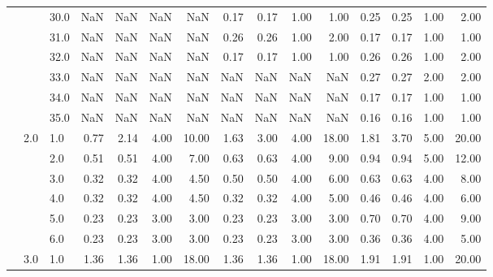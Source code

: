 \begin{tabular}{lllrrrrrrrrrrrr}
           &     & 30.0 &        NaN &       NaN &  NaN &    NaN &       0.17 &      0.17 & 1.00 &   1.00 &       0.25 &      0.25 & 1.00 &   2.00 \\
           &     & 31.0 &        NaN &       NaN &  NaN &    NaN &       0.26 &      0.26 & 1.00 &   2.00 &       0.17 &      0.17 & 1.00 &   1.00 \\
           &     & 32.0 &        NaN &       NaN &  NaN &    NaN &       0.17 &      0.17 & 1.00 &   1.00 &       0.26 &      0.26 & 1.00 &   2.00 \\
           &     & 33.0 &        NaN &       NaN &  NaN &    NaN &        NaN &       NaN &  NaN &    NaN &       0.27 &      0.27 & 2.00 &   2.00 \\
           &     & 34.0 &        NaN &       NaN &  NaN &    NaN &        NaN &       NaN &  NaN &    NaN &       0.17 &      0.17 & 1.00 &   1.00 \\
           &     & 35.0 &        NaN &       NaN &  NaN &    NaN &        NaN &       NaN &  NaN &    NaN &       0.16 &      0.16 & 1.00 &   1.00 \\
           & 2.0 & 1.0  &       0.77 &      2.14 & 4.00 &  10.00 &       1.63 &      3.00 & 4.00 &  18.00 &       1.81 &      3.70 & 5.00 &  20.00 \\
           &     & 2.0  &       0.51 &      0.51 & 4.00 &   7.00 &       0.63 &      0.63 & 4.00 &   9.00 &       0.94 &      0.94 & 5.00 &  12.00 \\
           &     & 3.0  &       0.32 &      0.32 & 4.00 &   4.50 &       0.50 &      0.50 & 4.00 &   6.00 &       0.63 &      0.63 & 4.00 &   8.00 \\
           &     & 4.0  &       0.32 &      0.32 & 4.00 &   4.50 &       0.32 &      0.32 & 4.00 &   5.00 &       0.46 &      0.46 & 4.00 &   6.00 \\
           &     & 5.0  &       0.23 &      0.23 & 3.00 &   3.00 &       0.23 &      0.23 & 3.00 &   3.00 &       0.70 &      0.70 & 4.00 &   9.00 \\
           &     & 6.0  &       0.23 &      0.23 & 3.00 &   3.00 &       0.23 &      0.23 & 3.00 &   3.00 &       0.36 &      0.36 & 4.00 &   5.00 \\
           & 3.0 & 1.0  &       1.36 &      1.36 & 1.00 &  18.00 &       1.36 &      1.36 & 1.00 &  18.00 &       1.91 &      1.91 & 1.00 &  20.00 \\
\bottomrule
\end{tabular}

